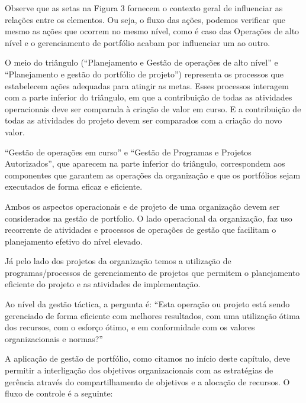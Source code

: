 \documentclass[12pt,a4paper,ruledheader,tocpage=prefix,floatnumber=continuous,pagestart=folhaderosto,font=times]{abnt}
\begin{document}
Observe que as setas na Figura 3 fornecem o contexto geral de influenciar as relações entre os elementos. Ou seja, o fluxo das ações, podemos verificar que mesmo as ações que ocorrem no mesmo nível, como é caso 
das Operações de alto nível e o gerenciamento de portfólio acabam por influenciar um ao outro.

O meio do triângulo (``Planejamento e Gestão de operações de alto nível'' e ``Planejamento e gestão do portfólio de projeto'') representa os processos 
que estabelecem ações adequadas para atingir as metas. Esses processos interagem com a parte inferior do triângulo, em que a contribuição de todas as 
atividades operacionais deve ser comparada à criação de valor em curso. E a contribuição de todas as atividades do projeto devem ser comparados com a 
criação do novo valor.

``Gestão de operações em curso'' e ``Gestão de Programas e Projetos Autorizados'', que aparecem na parte inferior do triângulo, correspondem aos 
componentes que garantem as operações da organização e que os portfólios sejam executados de forma eficaz e eficiente.\cite{sppm}

Ambos os aspectos operacionais e de projeto de uma organização devem ser considerados na gestão de portfolio. O lado operacional da organização, faz 
uso recorrente de atividades e processos de operações de gestão que facilitam o planejamento efetivo do nível elevado. 

Já pelo lado dos projetos da organização temos a utilização de programas/processos de gerenciamento de projetos que permitem o planejamento eficiente do 
projeto e as atividades de implementação.

Ao nível da gestão táctica, a pergunta é: ``Esta operação ou projeto está sendo gerenciado de forma eficiente com melhores resultados, com uma utilização 
ótima dos recursos, com o esforço ótimo, e em conformidade com os valores organizacionais e normas?''

A aplicação de gestão de portfólio, como citamos no início deste capítulo, deve permitir a interligação dos objetivos organizacionais com as estratégias de 
gerência através do compartilhamento de objetivos e a alocação de recursos. O fluxo de controle é a seguinte: \cite{sppm}
\end{document}
